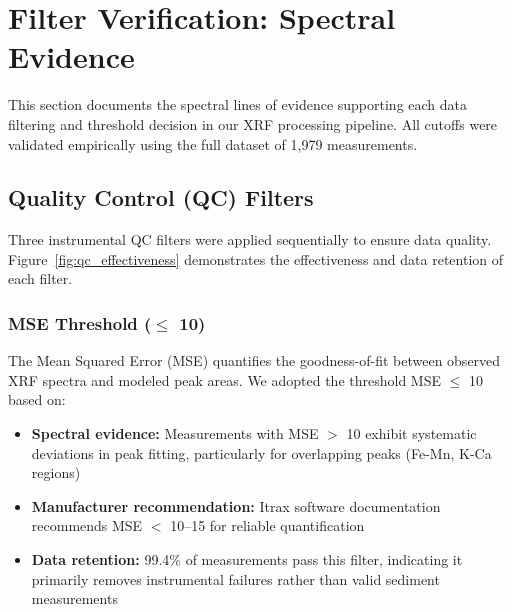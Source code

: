 
\section{Filter Verification: Spectral Evidence}
\label{sec:filter_verification}

This section documents the spectral lines of evidence supporting each data filtering and threshold decision in our XRF processing pipeline. All cutoffs were validated empirically using the full dataset of 1,979 measurements.

\subsection{Quality Control (QC) Filters}
\label{subsec:qc_filters}

Three instrumental QC filters were applied sequentially to ensure data quality. Figure~\ref{fig:qc_effectiveness} demonstrates the effectiveness and data retention of each filter.

\subsubsection{MSE Threshold ($\leq$ 10)}

The Mean Squared Error (MSE) quantifies the goodness-of-fit between observed XRF spectra and modeled peak areas. We adopted the threshold MSE $\leq$ 10 based on:

\begin{itemize}
    \item \textbf{Spectral evidence:} Measurements with MSE $>$ 10 exhibit systematic deviations in peak fitting, particularly for overlapping peaks (Fe-Mn, K-Ca regions)
    \item \textbf{Manufacturer recommendation:} Itrax software documentation recommends MSE $<$ 10--15 for reliable quantification
    \item \textbf{Data retention:} 99.4\% of measurements pass this filter, indicating it primarily removes instrumental failures rather than valid sediment measurements
\end{itemize}

